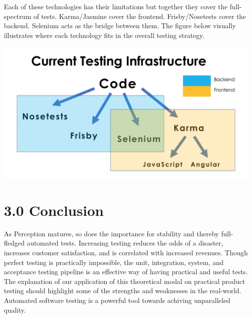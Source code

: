 \documentclass[12pt]{report}
\begin{document}
\par\noindent
Each of these technologies has their limitations but together they cover the full-spectrum of tests. Karma/Jasmine cover the frontend. Frisby/Nosetests cover the backend. Selenium acts as the bridge between them. The figure below visually illustrates where each technology fits in the overall testing strategy.

\begin{center}
\includegraphics[scale=0.3]{infra}
\end{center}

\newpage\thispagestyle{fancy}\sectionfont{\scshape}
\section*{3.0 Conclusion}
\par\noindent
As Perception matures, so does the importance for stability and thereby full-fledged automated tests. Increasing testing reduces the odds of a disaster, increases customer satisfaction, and is correlated with increased revenues. Though perfect testing is practically impossible, the unit, integration, system, and acceptance testing pipeline is an effective way of having practical and useful tests. The explanation of our application of this theoretical modal on practical product testing should highlight some of the strengths and weaknesses in the real-world. Automated software testing is a powerful tool towards achiving unparalleled quality.

 \noindent

\newpage
\end{document}
